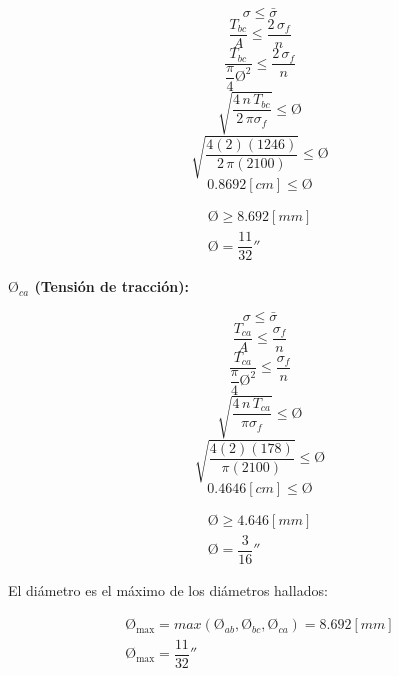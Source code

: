 \documentclass[letter,10pt,twoside]{article}
\begin{document}
\begin{equation*}
    \sigma \le \bar{\sigma}
\end{equation*}
\begin{equation*}
    \frac{T_{bc}}{A} \le \frac{2\,\sigma_f}{n}
\end{equation*}
\begin{equation*}
    \frac{T_{bc}}{\dfrac{\pi}{4} \text{\O}^2} \le \frac{2\,\sigma_f}{n}
\end{equation*}
\begin{equation*}
    \sqrt{\frac{4\,n\,T_{bc}}{2\,\pi\sigma_f}} \le \text{\O}
\end{equation*}
\begin{equation*}
    \sqrt{\frac{4(2)(1246)}{2\,\pi(2100)}} \le \text{\O}
\end{equation*}
\begin{equation*}
    0.8692[cm] \le \text{\O}
\end{equation*}

\begin{equation*}
\boxed{
    \begin{array}{l}
        \text{\O} \ge 8.692[mm] \\
        \text{\O} = \dfrac{11}{32}''
    \end{array}
}
\end{equation*}

\textbf{$\text{\O}_{ca}$ (Tensión de tracción):}

\begin{equation*}
    \sigma \le \bar{\sigma}
\end{equation*}
\begin{equation*}
    \frac{T_{ca}}{A} \le \frac{\sigma_f}{n}
\end{equation*}
\begin{equation*}
    \frac{T_{ca}}{\dfrac{\pi}{4} \text{\O}^2} \le \frac{\sigma_f}{n}
\end{equation*}
\begin{equation*}
    \sqrt{\frac{4\,n\,T_{ca}}{\pi\sigma_f}} \le \text{\O}
\end{equation*}
\begin{equation*}
    \sqrt{\frac{4(2)(178)}{\pi(2100)}} \le \text{\O}
\end{equation*}
\begin{equation*}
    0.4646[cm] \le \text{\O}
\end{equation*}

\begin{equation*}
\boxed{
    \begin{array}{l}
        \text{\O} \ge 4.646[mm] \\
        \text{\O} = \dfrac{3}{16}''
    \end{array}
}
\end{equation*}

El diámetro es el máximo de los diámetros hallados:

\begin{equation*}
\boxed{
    \begin{array}{l}
        \text{\O}_{\text{max}} = max(\text{\O}_{ab},\text{\O}_{bc},\text{\O}_{ca}) = 8.692[mm] \\
        \text{\O}_{\text{max}} = \dfrac{11}{32}''
    \end{array}
}
\end{equation*}
\end{document}

